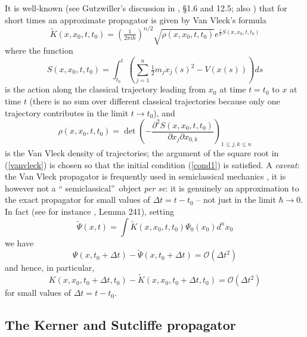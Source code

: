 \documentclass[12pt]{article}%
\begin{document}
It is well-known (see Gutzwiller's discussion in \cite{Gutz}, \S 1.6 and 12.5;
also \cite{ICP,MF,schulman}) that for short times an approximate propagator is
given by Van Vleck's formula%
\begin{equation}
\widetilde{K}(x,x_{0},t,t_{0})=\left(  \tfrac{1}{2\pi i\hbar}\right)
^{n/2}\sqrt{\rho(x,x_{0},t,t_{0})}e^{\frac{i}{\hbar}S(x,x_{0},t,t_{0})}
\label{vanvleck}%
\end{equation}
where the function
\begin{equation}
S(x,x_{0},t,t_{0})=\int_{t_{0}}^{t}\left(
{\textstyle\sum_{j=1}^{n}}
\tfrac{1}{2}m_{j}\dot{x}_{j}(s)^{2}-V(x(s))\right)  ds \label{actionex}%
\end{equation}
is the action along the classical trajectory leading from $x_{0}$ at time
$t=t_{0}$ to $x$ at time $t$ (there is no sum over different classical
trajectories because only one trajectory contributes in the limit
$t\rightarrow t_{0}$), and%
\begin{equation}
\rho(x,x_{0},t,t_{0})=\det\left(  -\frac{\partial^{2}S(x,x_{0},t,t_{0}%
)}{\partial x_{j}\partial x_{0,k}}\right)  _{1\leq j,k\leq n} \label{rho}%
\end{equation}
is the Van Vleck density of trajectories; the argument of the square root in
(\ref{vanvleck}) is chosen so that the initial condition (\ref{cond1}) is
satisfied. A \textit{caveat}: the Van Vleck propagator is frequently used in
semiclassical mechanics \cite{Gutz}, it is however not a \textquotedblleft
semiclassical\textquotedblright\ object \textit{per se}: it is genuinely an
approximation to the exact propagator for small values of $\Delta t=t-t_{0}$
-- not just in the limit $\hbar\rightarrow0$. In fact (see for instance
\cite{ICP}, Lemma 241), setting%
\[
\widetilde{\Psi}(x,t)=\int\widetilde{K}(x,x_{0},t,t_{0})\Psi_{0}(x_{0}%
)d^{n}x_{0}%
\]
we have%
\begin{equation}
\Psi(x,t_{0}+\Delta t)-\widetilde{\Psi}(x,t_{0}+\Delta t)=\mathcal{O}(\Delta
t^{2}) \label{estpsitilde}%
\end{equation}
and hence, in particular,
\begin{equation}
K(x,x_{0},t_{0}+\Delta t,t_{0})-\widetilde{K}(x,x_{0},t_{0}+\Delta
t,t_{0})=\mathcal{O}(\Delta t^{2}) \label{kk}%
\end{equation}
for small values of $\Delta t=t-t_{0}$.

\subsection{The Kerner and Sutcliffe propagator\label{secbon}}
\end{document}
